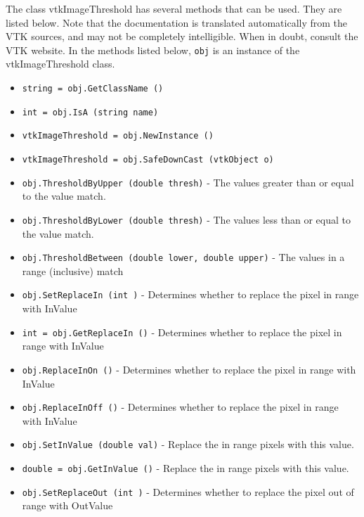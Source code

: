 The class vtkImageThreshold has several methods that can be used.
  They are listed below.
Note that the documentation is translated automatically from the VTK sources,
and may not be completely intelligible.  When in doubt, consult the VTK website.
In the methods listed below, \verb|obj| is an instance of the vtkImageThreshold class.
\begin{itemize}
\item  \verb|string = obj.GetClassName ()|

\item  \verb|int = obj.IsA (string name)|

\item  \verb|vtkImageThreshold = obj.NewInstance ()|

\item  \verb|vtkImageThreshold = obj.SafeDownCast (vtkObject o)|

\item  \verb|obj.ThresholdByUpper (double thresh)| -  The values greater than or equal to the value match.

\item  \verb|obj.ThresholdByLower (double thresh)| -  The values less than or equal to the value match.

\item  \verb|obj.ThresholdBetween (double lower, double upper)| -  The values in a range (inclusive) match

\item  \verb|obj.SetReplaceIn (int )| -  Determines whether to replace the pixel in range with InValue

\item  \verb|int = obj.GetReplaceIn ()| -  Determines whether to replace the pixel in range with InValue

\item  \verb|obj.ReplaceInOn ()| -  Determines whether to replace the pixel in range with InValue

\item  \verb|obj.ReplaceInOff ()| -  Determines whether to replace the pixel in range with InValue

\item  \verb|obj.SetInValue (double val)| -  Replace the in range pixels with this value.

\item  \verb|double = obj.GetInValue ()| -  Replace the in range pixels with this value.

\item  \verb|obj.SetReplaceOut (int )| -  Determines whether to replace the pixel out of range with OutValue


\end{itemize}
